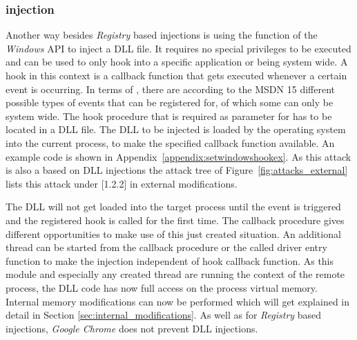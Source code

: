 \subsubsection{ injection}
Another way besides \emph{Registry} based injections is using the  function of the \emph{Windows} \gls{API} to inject a \gls{DLL} file. It requires no special privileges to be executed and can be used to only hook into a specific application or being system wide. A hook in this context is a callback function that gets executed whenever a certain event is occurring. In terms of , there are according to the \gls{MSDN} \cite{msdn_setwindowshookex} 15 different possible types of events that can be registered for, of which some can only be system wide. The hook procedure that is required as parameter for  has to be located in a \gls{DLL} file. The \gls{DLL} to be injected is loaded by the operating system into the current process, to make the specified callback function available. An example code is shown in Appendix~\ref{appendix:setwindowshookex}. As this attack is also a based on \gls{DLL} injections the attack tree of Figure~\ref{fig:attacks_external} lists this attack under [1.2.2] in external modifications. 

\medskip

The \gls{DLL} will not get loaded into the target process until the event is triggered and the registered hook is called for the first time. The callback procedure gives different opportunities to make use of this just created situation. An additional thread can be started from the callback procedure or the called driver entry function to make the injection independent of hook callback function. As this module and especially any created thread are running the context of the remote process, the \gls{DLL} code has now full access on the process virtual memory. Internal memory modifications can now be performed which will get explained in detail in Section \ref{sec:internal_modifications}. As well as for \emph{Registry} based injections, \emph{Google Chrome} does not prevent  \gls{DLL} injections.